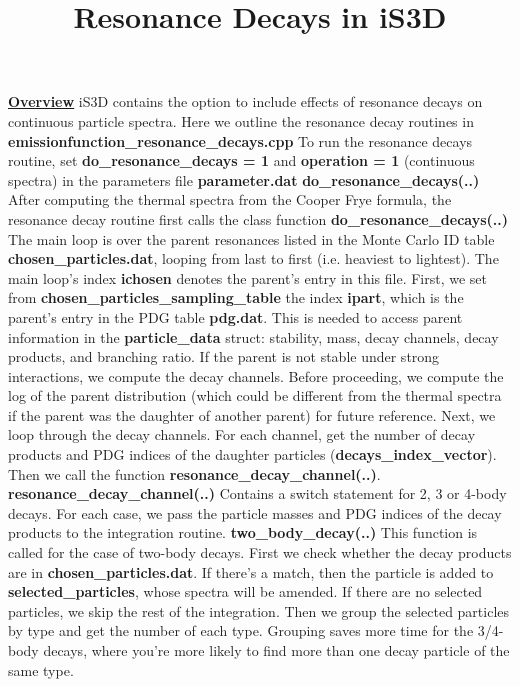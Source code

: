\documentclass[10.5pt,aps,prd,superscriptaddress]{revtex4}
\newcommand{\nn}{\newline\newline}
\begin{document}
\title{Resonance Decays in iS3D}
\maketitle 
\underline{\textbf{Overview}}
\nn
iS3D contains the option to include effects of resonance decays on continuous particle spectra. 
\nn
Here we outline the resonance decay routines in \textbf{emissionfunction\_resonance\_decays.cpp}
\nn
To run the resonance decays routine, set \textbf{do\_resonance\_decays = 1} and \textbf{operation = 1} (continuous spectra) in the parameters file \textbf{parameter.dat}
\nn
\nn
\textbf{do\_resonance\_decays(..)}
\nn
After computing the thermal spectra from the Cooper Frye formula, the resonance decay routine first calls the class function \textbf{do\_resonance\_decays(..)}
\nn
The main loop is over the parent resonances listed in the Monte Carlo ID table \textbf{chosen\_particles.dat}, looping from last to first (i.e. heaviest to lightest). The main loop's index \textbf{ichosen} denotes the parent's entry in this file.
\nn
First, we set from \textbf{chosen\_particles\_sampling\_table} the index \textbf{ipart}, which is the parent's entry in the PDG table \textbf{pdg.dat}. This is needed to access parent information in the \textbf{particle\_data} struct: stability, mass, decay channels, decay products, and branching ratio. 
\nn
If the parent is not stable under strong interactions, we compute the decay channels. Before proceeding, we compute the log of the parent distribution (which could be different from the thermal spectra if the parent was the daughter of another parent) for future reference. 
\nn
Next, we loop through the decay channels. For each channel, get the number of decay products and PDG indices of the daughter particles (\textbf{decays\_index\_vector}). Then we call the function \textbf{resonance\_decay\_channel(..)}. 
\nn
\nn
\textbf{resonance\_decay\_channel(..)}
\nn
Contains a switch statement for 2, 3 or 4-body decays. 
\nn
For each case, we pass the particle masses and PDG indices of the decay products to the integration routine.
\nn
\nn
\textbf{\textbf{two\_body\_decay(..)}}
\nn
This function is called for the case of two-body decays.
\nn
First we check whether the decay products are in \textbf{chosen\_particles.dat}. If there's a match, then the particle is added to \textbf{selected\_particles}, whose spectra will be amended. If there are no selected particles, we skip the rest of the integration. 
\nn
Then we group the selected particles by type and get the number of each type. Grouping saves more time for the 3/4-body decays, where you're more likely to find more than one decay particle of the same type.
\end{document}

